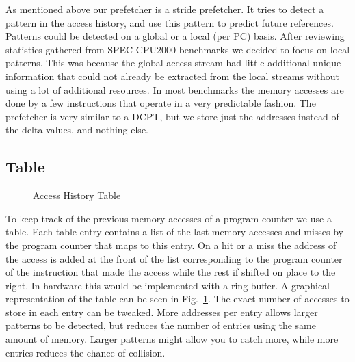 As mentioned above our prefetcher is a stride prefetcher. It tries to detect a 
pattern in the access history, and use this pattern to predict future 
references. Patterns could be detected on a global or a local (per PC) basis.
After reviewing statistics gathered from SPEC CPU2000 benchmarks we decided to 
focus on local patterns. This was because the global access stream had little 
additional unique information that could not already be extracted from the 
local streams without using a lot of additional resources. In most benchmarks 
the memory accesses are done by a few instructions that operate in a very 
predictable fashion. The prefetcher is very similar to a DCPT, but we store just the 
addresses instead of the delta values, and nothing else.

\subsection{Table}

\begin{figure}
	\caption{Access History Table}
	\label{fig:table}
\end{figure}

To keep track of the previous memory accesses of a program counter we use a
table. Each table entry contains a list of the last memory accesses and misses
by the program counter that maps to this entry. On a hit or a miss the address
of the access is added at the front of the list corresponding to the program
counter of the instruction that made the access while the rest if shifted on
place to the right. In hardware this would be implemented with a ring buffer. A
graphical representation of the table can be seen in Fig.~\ref{fig:table}. The
exact number of accesses to store in each entry can be tweaked. More addresses
per entry allows larger patterns to be detected, but reduces the number of
entries using the same amount of memory. Larger patterns might allow you to
catch more, while more entries reduces the chance of collision.

